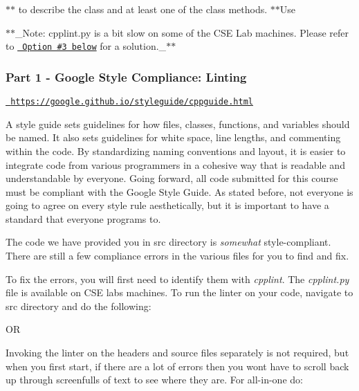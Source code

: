 $\ast$$\ast$ to describe the class and at least one of the class methods. $\ast$$\ast$\+Use

$\ast$$\ast$\+\_\+\+Note\+: cpplint.\+py is a bit slow on some of the C\+SE Lab machines. Please refer to \href{https://github.umn.edu/umn-csci-3081-F18/csci3081-shared-upstream/blob/support-code/HW/HW05/README.md\#alternative-options-for-running-cpplintpy}{\texttt{ Option \#3 below}} for a solution.\+\_\+$\ast$$\ast$

\subsubsection*{Part 1 -\/ Google Style Compliance\+: Linting}

\href{https://google.github.io/styleguide/cppguide.html}{\texttt{ https\+://google.\+github.\+io/styleguide/cppguide.\+html}}

A style guide sets guidelines for how files, classes, functions, and variables should be named. It also sets guidelines for white space, line lengths, and commenting within the code. By standardizing naming conventions and layout, it is easier to integrate code from various programmers in a cohesive way that is readable and understandable by everyone. Going forward, all code submitted for this course must be compliant with the Google Style Guide. As stated before, not everyone is going to agree on every style rule aesthetically, but it is important to have a standard that everyone programs to.

The code we have provided you in src directory is {\itshape somewhat} style-\/compliant. There are still a few compliance errors in the various files for you to find and fix.

To fix the errors, you will first need to identify them with {\itshape cpplint}. The {\itshape cpplint.\+py} file is available on C\+SE labs machines. To run the linter on your code, navigate to src directory and do the following\+:


\begin{DoxyCode}{0}
\end{DoxyCode}


OR


\begin{DoxyCode}{0}
\end{DoxyCode}


Invoking the linter on the headers and source files separately is not required, but when you first start, if there are a lot of errors then you won\textquotesingle{}t have to scroll back up through screenfulls of text to see where they are. For all-\/in-\/one do\+:


